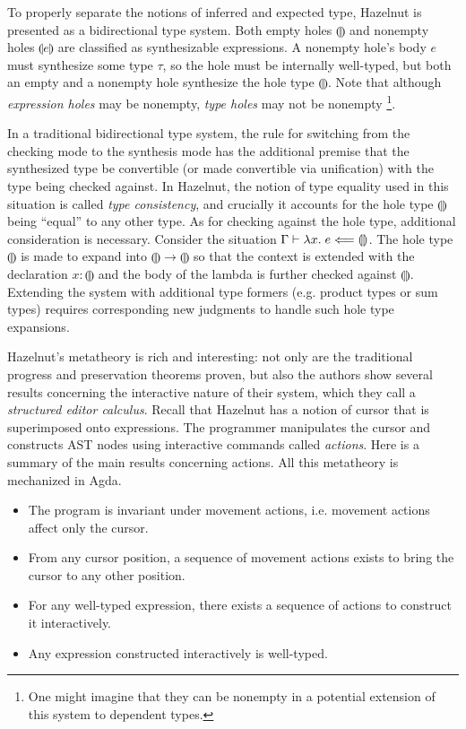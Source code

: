 \newcommand{\hole}[1]{\llparenthesis #1 \rrparenthesis}
To properly separate the notions of inferred and expected type, Hazelnut is
presented as a bidirectional type system.
Both empty holes $\hole{}$ and nonempty holes $\hole{e}$ are classified as
synthesizable expressions.
A nonempty hole's body $e$ must synthesize some type $\tau$, so the hole must be
internally well-typed, but both an empty and a nonempty hole synthesize the hole
type $\hole{}$.
Note that although \emph{expression holes} may be nonempty, \emph{type holes}
may not be nonempty%
\footnote{
  One might imagine that they can be nonempty in a
  potential extension of this system to dependent types.%
}.

In a traditional bidirectional type system, the rule for switching from the
checking mode to the synthesis mode has the additional premise that the
synthesized type be convertible (or made convertible via unification) with the
type being checked against.
In Hazelnut, the notion of type equality used in this situation is called
\emph{type consistency}, and crucially it accounts for the hole type $\hole{}$
being ``equal'' to any other type.
As for checking against the hole type, additional consideration is necessary.
Consider the situation $\Gamma \proves \lambda x.\; e \chk \hole{}$.
The hole type $\hole{}$ is made to expand into $\hole{} \to \hole{}$ so that the
context is extended with the declaration $x{:}\hole{}$ and the body of the
lambda is further checked against $\hole{}$.
Extending the system with additional type formers (e.g. product types or sum
types) requires corresponding new judgments to handle such hole type expansions.

Hazelnut's metatheory is rich and interesting: not only are the traditional
progress and preservation theorems proven, but also the authors show several
results concerning the interactive nature of their system, which they call a
\emph{structured editor calculus}.
Recall that Hazelnut has a notion of cursor that is superimposed onto
expressions.
The programmer manipulates the cursor and constructs AST nodes using interactive
commands called \emph{actions}.
Here is a summary of the main results concerning actions.
All this metatheory is mechanized in Agda.
\begin{itemize}
\item The program is invariant under movement actions, i.e. movement actions
  affect only the cursor.
\item From any cursor position, a sequence of movement actions exists
  to bring the cursor to any other position.
\item For any well-typed expression, there exists a sequence of actions to
  construct it interactively.
\item Any expression constructed interactively is well-typed.
\end{itemize}

